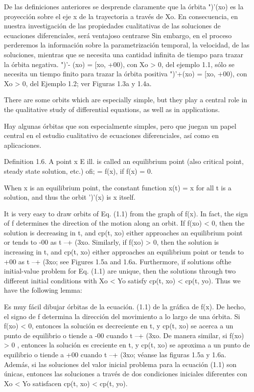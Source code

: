 \documentclass[]{article}
\begin{document}
{De las definiciones anteriores se desprende claramente que la órbita ")'(xo) es la proyección sobre el eje x de la trayectoria a través de Xo. En consecuencia, en nuestra investigación de las propiedades cualitativas de las soluciones de ecuaciones diferenciales, será ventajoso centrarse Sin embargo, en el proceso perderemos la información sobre la parametrización temporal, la velocidad, de las soluciones, mientras que se necesita una cantidad infinita de tiempo para trazar la órbita negativa. ")'- (xo) = [xo, +00), con Xo > 0, del ejemplo 1.1, sólo se necesita un tiempo finito para trazar la órbita positiva ")'+(xo) = [xo, +00), con Xo > 0, del Ejemplo 1.2; ver Figuras 1.3a y 1.4a.



There are some orbits which are especially simple, but they play a central role in the qualitative study of differential equations, as well as in applications.

Hay algunas órbitas que son especialmente simples, pero que juegan un papel central en el estudio cualitativo de ecuaciones diferenciales, así como en aplicaciones.

Definition 1.6. A point x E ill. is called an equilibrium point (also critical point, steady state solution, etc.) ofi; = f(x), if f(x) = 0.

When x is an equilibrium point, the constant function x(t) = x for all t is a solution, and thus the orbit ')'(x) is x itself.

It is very easy to draw orbits of Eq. (1.1) from the graph of f(x). In fact, the sign of f determines the direction of the motion along an orbit. If f(xo) < 0, then the solution is decreasing in t, and cp(t, xo) either approaches an equilibrium point or tends to -00 as t --+ (3xo. Similarly, if f(xo) > 0, then the solution is increasing in t, and cp(t, xo) either approaches an equilibrium point or tends to +00 as t --+ (3xo; see Figures 1.5a and 1.6a. Furthermore, if solutions ofthe initial-value problem for Eq. (1.1) are unique, then the solutions through two different initial conditions with Xo < Yo satisfy cp(t, xo) < cp(t, yo). Thus we have the following lemma:

Es muy fácil dibujar órbitas de la ecuación. (1.1) de la gráfica de f(x). De hecho, el signo de f determina la dirección del movimiento a lo largo de una órbita. Si f(xo) < 0, entonces la solución es decreciente en t, y cp(t, xo) se acerca a un punto de equilibrio o tiende a -00 cuando t --+ (3xo. De manera similar, si f(xo) > 0 , entonces la solución es creciente en t, y cp(t, xo) se aproxima a un punto de equilibrio o tiende a +00 cuando t --+ (3xo; véanse las figuras 1.5a y 1.6a. Además, si las soluciones del valor inicial problema para la ecuación (1.1) son únicas, entonces las soluciones a través de dos condiciones iniciales diferentes con Xo < Yo satisfacen cp(t, xo) < cp(t, yo).

}
\end{document}
